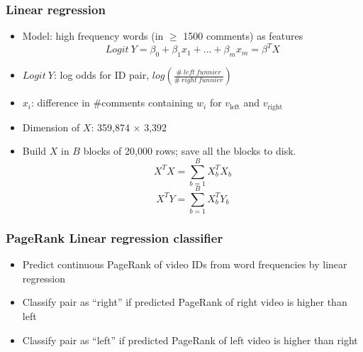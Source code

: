 \documentclass[fleqn]{beamer}
\begin{document}
\begin{frame}
\frametitle{Linear regression}
    \begin{itemize}
     \item Model: high frequency words (in $\geq$ 1500 comments) as features\\
     $$Logit\ Y = \beta_0 + \beta_1 x_1 + ... + \beta_m x_m = \beta^T X$$
     \item $Logit\ Y$: log odds for ID pair, $log(\frac{\#\ left\ funnier}{\#\ right\ funnier})$
     \item $x_i$:  difference in \#comments containing $w_i$ for 
              $v_{\mbox{left}}$ and $v_{\mbox{right}}$
     \item Dimension of $X$: 359,874 $\times$ 3,392
     \item Build $X$ in $B$ blocks of 20,000 rows; save all the blocks to disk.   \\
     $$X^TX = \sum_{b=1}^B X_b^TX_b$$
     $$X^TY = \sum_{b=1}^B X_b^TY_b$$
  \end{itemize}
\end{frame}

\begin{frame}
\frametitle{PageRank Linear regression classifier}
    \begin{itemize}
     \item Predict continuous PageRank of video IDs from word frequencies by linear regression
     \item Classify pair as ``right'' if predicted PageRank of right video is higher than left
     \item Classify pair as ``left'' if predicted PageRank of left video is higher than right
   \end{itemize}
\end{frame}
\end{document}
